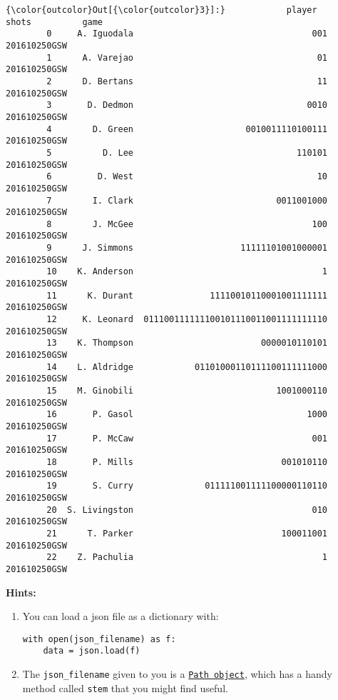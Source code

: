 \documentclass[11pt]{article}
\begin{document}
\begin{Verbatim}[commandchars=\\\{\}]
{\color{outcolor}Out[{\color{outcolor}3}]:}            player                                 shots          game
        0     A. Iguodala                                   001  201610250GSW
        1      A. Varejao                                    01  201610250GSW
        2      D. Bertans                                    11  201610250GSW
        3       D. Dedmon                                  0010  201610250GSW
        4        D. Green                      0010011110100111  201610250GSW
        5          D. Lee                                110101  201610250GSW
        6         D. West                                    10  201610250GSW
        7        I. Clark                            0011001000  201610250GSW
        8        J. McGee                                   100  201610250GSW
        9      J. Simmons                     11111101001000001  201610250GSW
        10    K. Anderson                                     1  201610250GSW
        11      K. Durant               11110010110001001111111  201610250GSW
        12     K. Leonard  011100111111100101110011001111111110  201610250GSW
        13    K. Thompson                         0000010110101  201610250GSW
        14    L. Aldridge            01101000110111100111111000  201610250GSW
        15    M. Ginobili                            1001000110  201610250GSW
        16       P. Gasol                                  1000  201610250GSW
        17       P. McCaw                                   001  201610250GSW
        18       P. Mills                             001010110  201610250GSW
        19       S. Curry              011111001111100000110110  201610250GSW
        20  S. Livingston                                   010  201610250GSW
        21      T. Parker                             100011001  201610250GSW
        22    Z. Pachulia                                     1  201610250GSW
\end{Verbatim}
            
    \textbf{Hints:}

\begin{enumerate}
\def\labelenumi{\arabic{enumi}.}
\item
  You can load a json file as a dictionary with:

\begin{verbatim}
with open(json_filename) as f:
    data = json.load(f)
\end{verbatim}
\item
  The \texttt{json\_filename} given to you is a
  \href{https://docs.python.org/3/library/pathlib.html}{\texttt{Path\ object}},
  which has a handy method called \texttt{stem} that you might find
  useful.
\end{enumerate}
\end{document}
